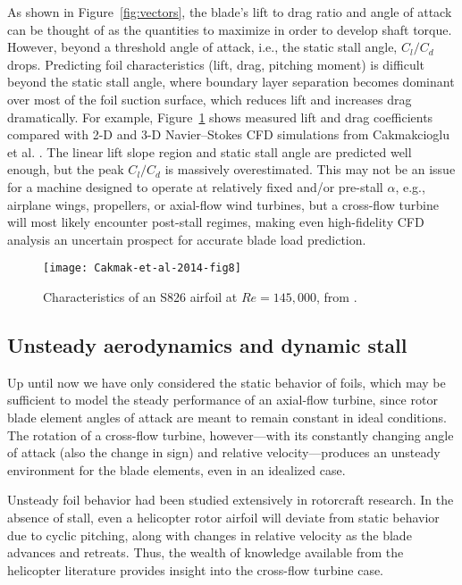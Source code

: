 As shown in Figure~\ref{fig:vectors}, the blade's lift to drag ratio and angle
of attack can be thought of as the quantities to maximize in order to develop
shaft torque. However, beyond a threshold angle of attack, i.e., the static
stall angle, $C_l/C_d$ drops. Predicting foil characteristics (lift, drag,
pitching moment) is difficult beyond the static stall angle, where boundary
layer separation becomes dominant over most of the foil suction surface, which
reduces lift and increases drag dramatically. For example,
Figure~\ref{fig:S826-perf} shows measured lift and drag coefficients compared
with 2-D and 3-D Navier--Stokes CFD simulations from Cakmakcioglu et al.
\cite{Cakmakcioglu2014}. The linear lift slope region and static stall angle are
predicted well enough, but the peak $C_l/C_d$ is massively overestimated. This
may not be an issue for a machine designed to operate at relatively fixed and/or
pre-stall $\alpha$, e.g., airplane wings, propellers, or axial-flow wind
turbines, but a cross-flow turbine will most likely encounter post-stall
regimes, making even high-fidelity CFD analysis an uncertain prospect for
accurate blade load prediction.

\begin{figure}[ht]
    \centering
    
    \texttt{[image: Cakmak-et-al-2014-fig8]}
    
    \caption{Characteristics of an S826 airfoil at $Re=145,000$, from
        \cite{Cakmakcioglu2014}.}
    
    \label{fig:S826-perf}
\end{figure}


\subsection{Unsteady aerodynamics and dynamic stall}

Up until now we have only considered the static behavior of foils, which may be
sufficient to model the steady performance of an axial-flow turbine, since rotor
blade element angles of attack are meant to remain constant in ideal conditions.
The rotation of a cross-flow turbine, however---with its constantly changing
angle of attack (also the change in sign) and relative velocity---produces an
unsteady environment for the blade elements, even in an idealized case.

Unsteady foil behavior had been studied extensively in rotorcraft research. In
the absence of stall, even a helicopter rotor airfoil will deviate from static
behavior due to cyclic pitching, along with changes in relative velocity as the
blade advances and retreats. Thus, the wealth of knowledge available from the
helicopter literature provides insight into the cross-flow turbine case.

